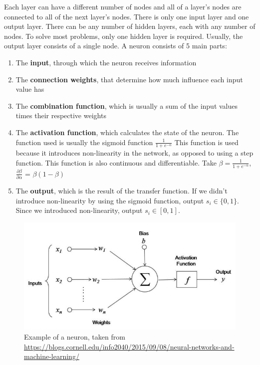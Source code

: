 \documentclass[11pt]{article}
\begin{document}
Each layer can have a different number of nodes and all of a layer's nodes are connected to all of the next layer's nodes. There is only one input layer and one output layer. There can be any number of hidden layers, each with any number of nodes. To solve most problems, only one hidden layer is required. Usually, the output layer consists of a single node.
A neuron consists of 5 main parts:
\begin{enumerate}
\item The \textbf{input}, through which the neuron receives information
\item The \textbf{connection weights}, that determine how much influence each input value has
\item The \textbf{combination function}, which is usually a sum of the input values times their respective weights
\item The \textbf{activation function}, which calculates the state of the neuron. The function used is usually the sigmoid function $\frac{1}{1+e^{-\alpha}}$ This function is used because it introduces non-linearity in the network, as opposed to using a step function. This function is also continuous and differentiable. Take $\beta = \frac{1}{1+e^{-\alpha}}$, $\frac{\partial\beta}{\partial\alpha}$ = $\beta (1-\beta)$
\item The \textbf{output}, which is the result of the transfer function. If we didn't introduce non-linearity by using the sigmoid function, output $s_i \in \{0, 1\}$. Since we introduced non-linearity, output $s_i \in [0, 1]$.
\end{enumerate}
\begin{figure}[H]
\label{fig:example}
\includegraphics[scale=0.5]{neuron.jpg}
\centering
\caption{Example of a neuron, taken from \url{https://blogs.cornell.edu/info2040/2015/09/08/neural-networks-and-machine-learning/}}
\end{figure}
\hfill \break
\hfill \break
\end{document}
